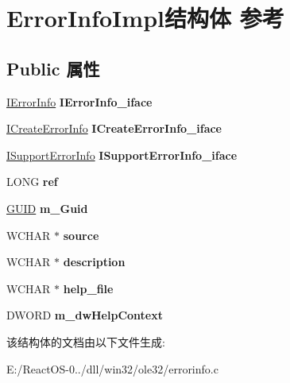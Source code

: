 \hypertarget{struct_error_info_impl}{}\section{Error\+Info\+Impl结构体 参考}
\label{struct_error_info_impl}
\subsection*{Public 属性}
\begin{DoxyCompactItemize}
\item 
\mbox{\label{struct_error_info_impl_abe4df10c6670ff5b927e5b25c5d801e4}} 
\hyperlink{interface_i_error_info}{I\+Error\+Info} {\bfseries I\+Error\+Info\+\_\+iface}
\item 
\mbox{\label{struct_error_info_impl_a68b8831d48f15966d163411be91dc173}} 
\hyperlink{interface_i_create_error_info}{I\+Create\+Error\+Info} {\bfseries I\+Create\+Error\+Info\+\_\+iface}
\item 
\mbox{\label{struct_error_info_impl_a2c3a1dfb8d22d5e59b5debbdbb23121a}} 
\hyperlink{interface_i_support_error_info}{I\+Support\+Error\+Info} {\bfseries I\+Support\+Error\+Info\+\_\+iface}
\item 
\mbox{\label{struct_error_info_impl_a51f36f87ef144de6439113ee8781c797}} 
L\+O\+NG {\bfseries ref}
\item 
\mbox{\label{struct_error_info_impl_a69f92829ea525b105550130b49b1ab14}} 
\hyperlink{interface_g_u_i_d}{G\+U\+ID} {\bfseries m\+\_\+\+Guid}
\item 
\mbox{\label{struct_error_info_impl_abade303a309e7d2fec4c974e8e6cf866}} 
W\+C\+H\+AR $\ast$ {\bfseries source}
\item 
\mbox{\label{struct_error_info_impl_aa6602d5db1da758d06a9f26bd6a6d7a2}} 
W\+C\+H\+AR $\ast$ {\bfseries description}
\item 
\mbox{\label{struct_error_info_impl_a74aeaa0fa6f172a98206c9da6650fad5}} 
W\+C\+H\+AR $\ast$ {\bfseries help\+\_\+file}
\item 
\mbox{\label{struct_error_info_impl_aaf6d3801881b4816d1c3341343f03d0d}} 
D\+W\+O\+RD {\bfseries m\+\_\+dw\+Help\+Context}
\end{DoxyCompactItemize}


该结构体的文档由以下文件生成\+:\begin{DoxyCompactItemize}
\item 
E\+:/\+React\+O\+S-\/0../dll/win32/ole32/errorinfo.\+c\end{DoxyCompactItemize}
